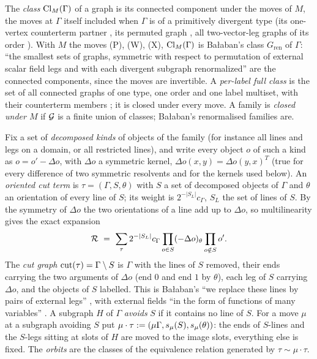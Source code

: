 \begin{definition}[classes]\label{def:a07:class}
The \emph{class} $\operatorname{Cl}_M(\Gamma)$ of a graph is its connected component under the moves of $M$, the moves at $\Gamma$ itself included when $\Gamma$ is of a primitively divergent type (its one-vertex counterterm partner \cite[p.~430]{Ba3}, its permuted graph \cite[p.~429]{Ba3}, all two-vector-leg graphs of its order \cite[p.~431]{Ba3}). With $M$ the moves (P), (W), (X), $\operatorname{Cl}_M(\Gamma)$ is Ba{\l}aban's class $G_{\mathrm{ren}}$ of $\Gamma$: ``the smallest sets of graphs, symmetric with respect to permutation of external scalar field legs and with each divergent subgraph renormalized'' \cite[p.~429]{Ba3} are the connected components, since the moves are invertible. A \emph{per-label full class} is the set of all connected graphs of one type, one order and one label multiset, with their counterterm members \cite[p.~431]{Ba3}; it is closed under every move. A family is \emph{closed under $M$} if $\mathcal G$ is a finite union of classes; Ba{\l}aban's renormalised families are.
\end{definition}

\begin{definition}\label{def:a07:cut}
Fix a set of \emph{decomposed kinds} of objects of the family (for instance all lines and legs on a domain, or all restricted lines), and write every object $o$ of such a kind as $o=o'-\Delta o$, with $\Delta o$ a symmetric kernel, $\Delta o(x,y)=\Delta o(y,x)^{T}$ (true for every difference of two symmetric resolvents and for the kernels used below). An \emph{oriented cut term} is $\tau=(\Gamma,S,\theta)$ with $S$ a set of decomposed objects of $\Gamma$ and $\theta$ an orientation of every line of $S$; its weight is $2^{-|S_L|}c_\Gamma$, $S_L$ the set of lines of $S$. By the symmetry of $\Delta o$ the two orientations of a line add up to $\Delta o$, so multilinearity gives the exact expansion
\begin{equation}\label{eq:a07:tel}
\mathcal R\ =\ \sum_{\tau}2^{-|S_L|}c_\Gamma\prod_{o\in S}(-\Delta o)_\theta\prod_{o\notin S}o'.
\end{equation}
The \emph{cut graph} $\operatorname{cut}(\tau)=\Gamma\setminus S$ is $\Gamma$ with the lines of $S$ removed, their ends carrying the two arguments of $\Delta o$ (end $0$ and end $1$ by $\theta$), each leg of $S$ carrying $\Delta o$, and the objects of $S$ labelled. This is Ba{\l}aban's ``we replace these lines by pairs of external legs'' \cite[p.~432]{Ba3}, with external fields ``in the form of functions of many variables'' \cite[p.~419]{Ba3}. A subgraph $H$ of $\Gamma$ \emph{avoids} $S$ if it contains no line of $S$. For a move $\mu$ at a subgraph avoiding $S$ put $\mu\cdot\tau:=(\mu\Gamma,s_\mu(S),s_\mu(\theta))$: the ends of $S$-lines and the $S$-legs sitting at slots of $H$ are moved to the image slots, everything else is fixed. The \emph{orbits} are the classes of the equivalence relation generated by $\tau\sim\mu\cdot\tau$.
\end{definition}

